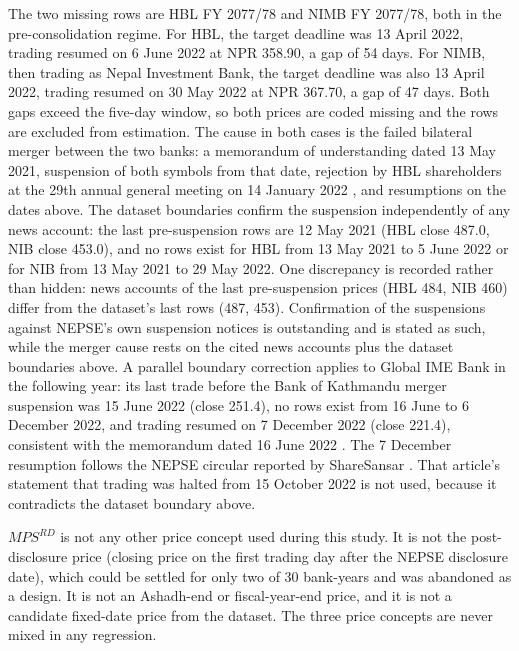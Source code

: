 The two missing rows are HBL FY 2077/78 and NIMB FY 2077/78, both in the pre-consolidation regime. For HBL, the target deadline was 13 April 2022, trading resumed on 6 June 2022 at NPR 358.90, a gap of 54 days. For NIMB, then trading as Nepal Investment Bank, the target deadline was also 13 April 2022, trading resumed on 30 May 2022 at NPR 367.70, a gap of 47 days. Both gaps exceed the five-day window, so both prices are coded missing and the rows are excluded from estimation. The cause in both cases is the failed bilateral merger between the two banks: a memorandum of understanding dated 13 May 2021, suspension of both symbols from that date, rejection by HBL shareholders at the 29th annual general meeting on 14 January 2022 \citep{tht2022hblnibl}, and resumptions on the dates above. The dataset boundaries confirm the suspension independently of any news account: the last pre-suspension rows are 12 May 2021 (HBL close 487.0, NIB close 453.0), and no rows exist for HBL from 13 May 2021 to 5 June 2022 or for NIB from 13 May 2021 to 29 May 2022. One discrepancy is recorded rather than hidden: news accounts of the last pre-suspension prices (HBL 484, NIB 460) \citep{tht2022hblnibl,sharesansar2022nib} differ from the dataset's last rows (487, 453). Confirmation of the suspensions against NEPSE's own suspension notices is outstanding and is stated as such, while the merger cause rests on the cited news accounts plus the dataset boundaries above. A parallel boundary correction applies to Global IME Bank in the following year: its last trade before the Bank of Kathmandu merger suspension was 15 June 2022 (close 251.4), no rows exist from 16 June to 6 December 2022, and trading resumed on 7 December 2022 (close 221.4), consistent with the memorandum dated 16 June 2022 \citep{corporatekhabar2022gbime}. The 7 December resumption follows the NEPSE circular reported by ShareSansar \citep{sharesansar2022gbime}. That article's statement that trading was halted from 15 October 2022 is not used, because it contradicts the dataset boundary above.

$\mathit{MPS}^{RD}$ is not any other price concept used during this study. It is not the post-disclosure price (closing price on the first trading day after the NEPSE disclosure date), which could be settled for only two of 30 bank-years and was abandoned as a design. It is not an Ashadh-end or fiscal-year-end price, and it is not a candidate fixed-date price from the dataset. The three price concepts are never mixed in any regression.

